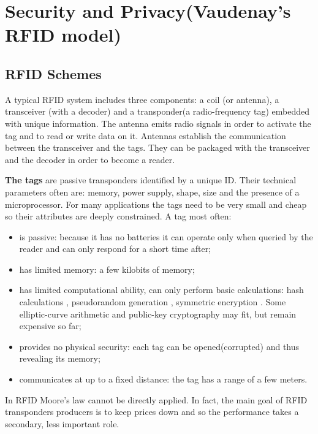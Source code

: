 \chapter{Security and Privacy(Vaudenay's RFID model)}

\section{RFID Schemes}

        A typical RFID system includes three components: a coil (or antenna), a transceiver (with a decoder) and a
    transponder(a radio-frequency tag) embedded with unique information. The antenna emits radio signals in order to activate the tag and 
    to read or write data on it. Antennas establish the communication between the transceiver and the tags. They can be packaged with 
    the transceiver and the decoder in order to become a reader. 

        \textbf{The tags} are passive transponders identified by a unique ID. Their technical parameters often are: memory, power supply, shape, size and the presence of a 
    microprocessor. For many applications the tags need to be very small and cheap so their attributes are deeply constrained. A tag most often:
    \begin{itemize}
        \item is passive: because it has no batteries it can operate only when queried by the reader and can only respond for a short time after;
        \item has limited memory: a few kilobits of memory;
        \item has limited computational ability, can only perform basic calculations: hash calculations \cite{Feldhofer}, pseudorandom generation \cite{Robshaw}, 
        symmetric encryption \cite{Feldhofer2}. Some elliptic-curve arithmetic and public-key cryptography may fit, but remain expensive so far;
        \item provides no physical security: each tag can be opened(corrupted) and thus revealing its memory;
        \item communicates at up to a fixed distance: the tag has a range of a few meters.
    \end{itemize}
    
    In RFID Moore's law cannot be directly applied. In fact, the main goal of RFID transponders producers is to keep prices down and so the performance takes
    a secondary, less important role.

